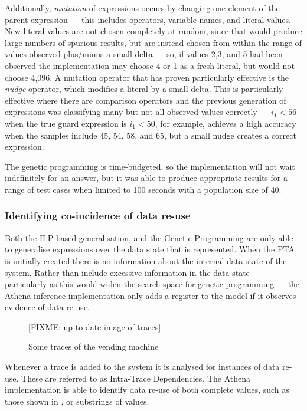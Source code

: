 Additionally, \emph{mutation} of expressions occurs by changing one element of the parent expression --- this includes operators, variable names, and literal values. New literal values are not chosen completely at random, since that would produce large numbers of spurious results, but are instead chosen from within the range of values observed plus/minus a small delta --- so, if values 2,3, and 5 had been observed the implementation may choose 4 or 1 as a fresh literal, but would not choose 4,096. A mutation operator that has proven particularly effective is the \emph{nudge} operator, which modifies a literal by a small delta. This is particularly effective where there are comparison operators and the previous generation of expressions was classifying many but not all observed values correctly --- $i_1 < 56$ when the true guard expression is $i_1 < 50$, for example, achieves a high accuracy when the samples include 45, 54, 58, and 65, but a small nudge creates a correct expression.

The genetic programming is time-budgeted, so the implementation will not wait indefinitely for an answer, but it was able to produce appropriate results for a range of test cases when limited to 100 seconds with a population size of 40.

\subsubsection{Identifying co-incidence of data re-use}
\label{IntertraceDependencies}

Both the ILP based generalisation, and the Genetic Programming are only able to generalise expressions over the data state that is represented. When the PTA is initially created there is no information about the internal data state of the system. Rather than include excessive information in the data state --- particularly as this would widen the search space for genetic programming --- the Athena inference implementation only adds a register to the model if it observes evidence of data re-use.

\begin{figure}[h]
\begin{center}
[FIXME: up-to-date image of traces]
\caption{Some traces of the vending machine}
\label{fig:pta}
\end{center}
\end{figure}

Whenever a trace is added to the system it is analysed for instances of data re-use. These are referred to as Intra-Trace Dependencies. The Athena implementation is able to identify data re-use of both complete values, such as those shown in , or substrings of values. 


